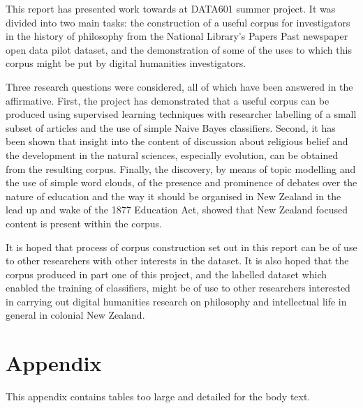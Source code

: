 \documentclass{article}
\begin{document}
This report has presented work towards at DATA601 summer project. It was divided into two main tasks: the construction of a useful corpus for investigators in the history of philosophy from the National Library's Papers Past newspaper open data pilot dataset, and the demonstration of some of the uses to which this corpus might be put by digital humanities investigators.

Three research questions were considered, all of which have been answered in the affirmative. First, the project has demonstrated that a useful corpus can be produced using supervised learning techniques with researcher labelling of a small subset of articles and the use of simple Naive Bayes classifiers. Second, it has been shown that insight into the content of discussion about religious belief and the development in the natural sciences, especially evolution, can be obtained from the resulting corpus. %
Finally, the discovery, by means of topic modelling and the use of simple word clouds, of the presence and prominence of debates over the nature of education and the way it should be organised in New Zealand in the lead up and wake of the 1877 Education Act, showed that New Zealand focused content is present within the corpus.

It is hoped that process of corpus construction set out in this report can be of use to other researchers with other interests in the dataset. It is also hoped that the corpus produced in part one of this project, and the labelled dataset which enabled the training of classifiers, might be of use to other researchers interested in carrying out digital humanities research on philosophy and intellectual life in general in colonial New Zealand.

\begin{sloppypar}
\printbibliography
\end{sloppypar}

\pagebreak

\renewcommand\thesection{\Alph{section}}
\setcounter{section}{0}
\setcounter{subsection}{0}
\setcounter{table}{0}
\section{Appendix}

This appendix contains tables too large and detailed for the body text.
\end{document}
